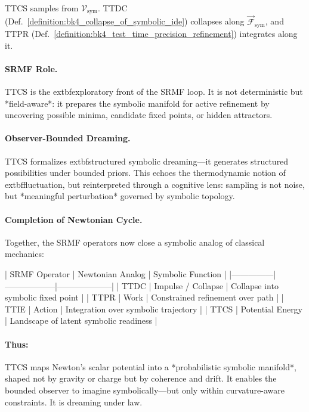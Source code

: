 \begin{scholium}
TTCS samples from $\mathcal{V}_{\text{sym}}$.
TTDC (Def.~\ref{definition:bk4_collapse_of_symbolic_ide}) collapses along
$\vec{\mathcal{F}}_{\text{sym}}$, and TTPR
(Def.~\ref{definition:bk4_test_time_precision_refinement}) integrates along it.

\paragraph{SRMF Role.} TTCS is the 	extbf{exploratory front} of the SRMF loop. It is not deterministic but *field-aware*: it prepares the symbolic manifold for active refinement by uncovering possible minima, candidate fixed points, or hidden attractors.

\paragraph{Observer-Bounded Dreaming.} TTCS formalizes 	extbf{structured symbolic dreaming}---it generates structured possibilities under bounded priors. This echoes the thermodynamic notion of 	extbf{fluctuation}, but reinterpreted through a cognitive lens: sampling is not noise, but *meaningful perturbation* governed by symbolic topology.

\paragraph{Completion of Newtonian Cycle.} Together, the SRMF operators now close a symbolic analog of classical mechanics:

| SRMF Operator | Newtonian Analog | Symbolic Function |
|---------------|------------------|--------------------|
| TTDC          | Impulse / Collapse | Collapse into symbolic fixed point |
| TTPR          | Work              | Constrained refinement over path |
| TTIE          | Action            | Integration over symbolic trajectory |
| TTCS          | Potential Energy  | Landscape of latent symbolic readiness |

\paragraph{Thus:} TTCS maps Newton's scalar potential into a *probabilistic symbolic manifold*, shaped not by gravity or charge but by coherence and drift. It enables the bounded observer to imagine symbolically---but only within curvature-aware constraints. It is dreaming under law.

\end{scholium}

